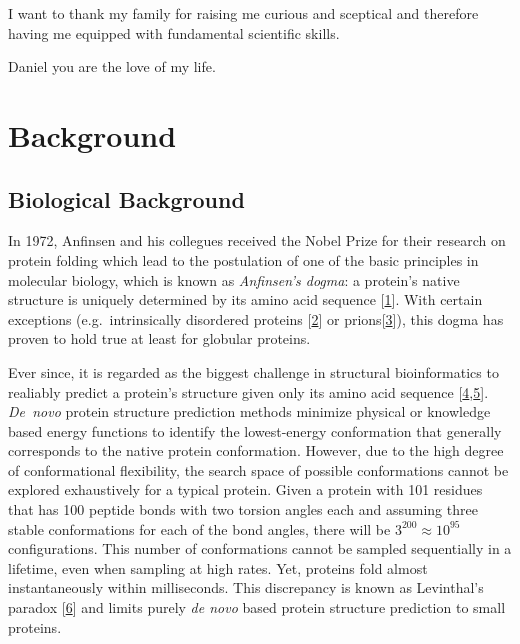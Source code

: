\documentclass[11pt,a4paper,twoside]{book}
\theoremstyle{definition}
\theoremstyle{definition}
\theoremstyle{remark}
\begin{document}
I want to thank my family for raising me curious and sceptical and
therefore having me equipped with fundamental scientific skills.

Daniel you are the love of my life.

\tableofcontents
{}

\mainmatter \setcounter{page}{1}

\chapter{Background}\label{background}

\section{Biological Background}\label{general-intro}

In 1972, Anfinsen and his collegues received the Nobel Prize for their
research on protein folding which lead to the postulation of one of the
basic principles in molecular biology, which is known as
\emph{Anfinsen's dogma}: a protein's native structure is uniquely
determined by its amino acid sequence
{[}\protect\hyperlink{ref-Anfinsen1973}{1}{]}. With certain exceptions
(e.g.~intrinsically disordered proteins
{[}\protect\hyperlink{ref-Wright1999}{2}{]} or
prions{[}\protect\hyperlink{ref-Fraser2014}{3}{]}), this dogma has
proven to hold true at least for globular proteins.

Ever since, it is regarded as the biggest challenge in structural
bioinformatics to realiably predict a protein's structure given only its
amino acid sequence
{[}\protect\hyperlink{ref-Samish2015}{4},\protect\hyperlink{ref-Schwede2013}{5}{]}.
\emph{De~novo} protein structure prediction methods minimize physical or
knowledge based energy functions to identify the lowest-energy
conformation that generally corresponds to the native protein
conformation. However, due to the high degree of conformational
flexibility, the search space of possible conformations cannot be
explored exhaustively for a typical protein. Given a protein with 101
residues that has 100 peptide bonds with two torsion angles each and
assuming three stable conformations for each of the bond angles, there
will be \(3^{200} \approx 10^{95}\) configurations. This number of
conformations cannot be sampled sequentially in a lifetime, even when
sampling at high rates. Yet, proteins fold almost instantaneously within
milliseconds. This discrepancy is known as Levinthal's paradox
{[}\protect\hyperlink{ref-Levinthal1969}{6}{]} and limits purely
\emph{de novo} based protein structure prediction to small proteins.
\end{document}

